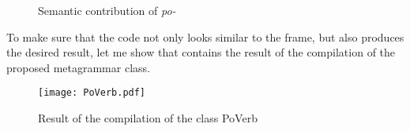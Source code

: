 \begin{figure}
\caption{Semantic contribution of \textit{po-}\label{frame:po:delim:rep}}
\end{figure}

To make sure that the code not only looks similar to the frame, but also produces the desired result, let me show  that contains the result of the compilation of the proposed metagrammar class.
\begin{figure}
\texttt{[image: PoVerb.pdf]}
\caption{Result of the compilation of the class PoVerb \label{fig:poverb}}
\end{figure}


